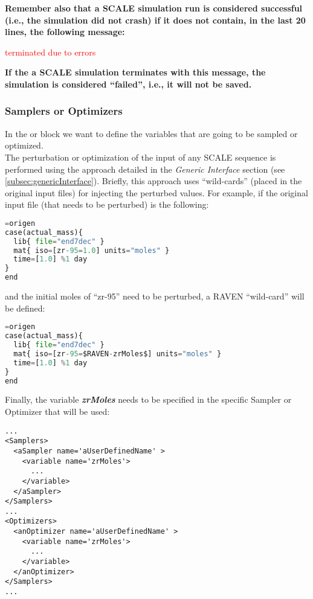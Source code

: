 \textbf{Remember also that a SCALE simulation run is considered successful (i.e., the simulation did not crash) if it does not contain, in
the last 20 lines, the following message:}

\textcolor{red}{terminated due to errors}

\textbf{If the a SCALE simulation terminates with this message, the simulation is considered ``failed'', i.e., it will not be saved.}

\subsubsection{Samplers or Optimizers}
In the  or   block we want to define the variables that are going
to be sampled or optimized.
%
\\The perturbation or optimization of the input of any SCALE sequence is performed using the approach detailed in the \textit{Generic Interface} section (see \ref{subsec:genericInterface}). Briefly, this approach uses
 ``wild-cards'' (placed in the original input files) for injecting the perturbed values.
 For example, if the original input file (that needs to be perturbed) is the following:
\begin{lstlisting}[language=python]
=origen
case(actual_mass){
  lib{ file="end7dec" }
  mat{ iso=[zr-95=1.0] units="moles" }
  time=[1.0] %1 day
}
end
\end{lstlisting}
and  the initial moles of ``zr-95'' need to be perturbed, a RAVEN ``wild-card'' will be defined:
\begin{lstlisting}[language=python]
=origen
case(actual_mass){
  lib{ file="end7dec" }
  mat{ iso=[zr-95=$RAVEN-zrMoles$] units="moles" }
  time=[1.0] %1 day
}
end
\end{lstlisting}

Finally, the variable \textbf{\textit{zrMoles}} needs to be specified in the specific Sampler or Optimizer that will be used:

\begin{lstlisting}[style=XML]
...
<Samplers>
  <aSampler name='aUserDefinedName' >
    <variable name='zrMoles'>
      ...
    </variable>
  </aSampler>
</Samplers>
...
<Optimizers>
  <anOptimizer name='aUserDefinedName' >
    <variable name='zrMoles'>
      ...
    </variable>
  </anOptimizer>
</Samplers>
...
\end{lstlisting}
%
